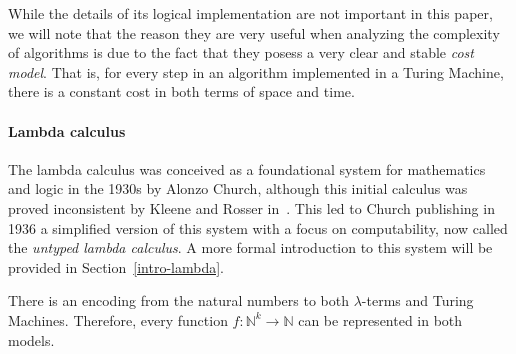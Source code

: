 \message{ !name(VU-CS-BSc-thesis-template.tex)}\documentclass[11pt]{article}
\begin{document}
While the details of its logical implementation are not important in this paper, we will note that the reason they are very useful when analyzing the complexity of algorithms is due to the fact that they posess a very clear and stable \textit{cost model}. That is, for every step in an algorithm implemented in a Turing Machine, there is a constant cost in both terms of space and time.

\paragraph{Lambda calculus}
The lambda calculus was conceived as a foundational system for mathematics and logic in the 1930s by Alonzo Church, although this initial calculus was proved inconsistent by Kleene and Rosser in~\cite{rosser-kleene-inconsistency}. This led to Church publishing in 1936 a simplified version of this system with a focus on computability, now called the \textit{untyped lambda calculus}. A more formal introduction to this system will be provided in Section~\ref{intro-lambda}.

There is an encoding from the natural numbers to both $\lambda$-terms and Turing Machines. Therefore, every function $f : \mathbb{N}^k \rightarrow \mathbb{N}$ can be represented in both models.
\end{document}
